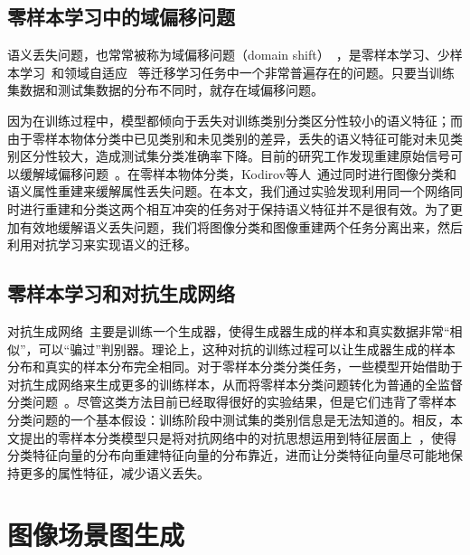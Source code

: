\subsection{零样本学习中的域偏移问题}
语义丢失问题，也常常被称为域偏移问题（domain shift）~\cite{fu2015transductive,saenko2010adapting}，是零样本学习、少样本学习~\cite{hariharan2017low}和领域自适应~\cite{motiian2017unified,panareda2017open}
等迁移学习任务中一个非常普遍存在的问题。只要当训练集数据和测试集数据的分布不同时，就存在域偏移问题。

因为在训练过程中，模型都倾向于丢失对训练类别分类区分性较小的语义特征；而由于零样本物体分类中已见类别和未见类别的差异，丢失的语义特征可能对未见类别区分性较大，造成测试集分类准确率下降。目前的研究工作发现重建原始信号可以缓解域偏移问题~\cite{kim2017learning}。在零样本物体分类，Kodirov等人~\cite{kodirov2017semantic}通过同时进行图像分类和语义属性重建来缓解属性丢失问题。在本文，我们通过实验发现利用同一个网络同时进行重建和分类这两个相互冲突的任务对于保持语义特征并不是很有效。为了更加有效地缓解语义丢失问题，我们将图像分类和图像重建两个任务分离出来，然后利用对抗学习来实现语义的迁移。

\subsection{零样本学习和对抗生成网络}
对抗生成网络~\cite{goodfellow2014generative}主要是训练一个生成器，使得生成器生成的样本和真实数据非常“相似”，可以“骗过”判别器。理论上，这种对抗的训练过程可以让生成器生成的样本分布和真实的样本分布完全相同。对于零样本分类分类任务，一些模型开始借助于对抗生成网络来生成更多的训练样本，从而将零样本分类问题转化为普通的全监督分类问题~\cite{mishra2018generative,xian2018feature,xian2019f}。尽管这类方法目前已经取得很好的实验结果，但是它们违背了零样本分类问题的一个基本假设：训练阶段中测试集的类别信息是无法知道的。相反，本文提出的零样本分类模型只是将对抗网络中的对抗思想运用到特征层面上~\cite{odena2017conditional,tzeng2017adversarial,makhzani2015adversarial,shrivastava2017learning}，使得分类特征向量的分布向重建特征向量的分布靠近，进而让分类特征向量尽可能地保持更多的属性特征，减少语义丢失。


\section{图像场景图生成}

